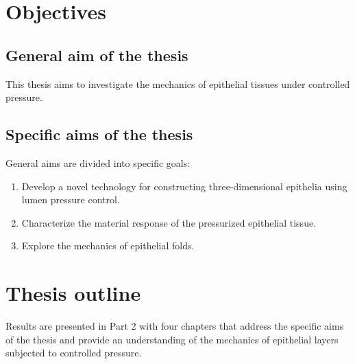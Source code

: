 \hypertarget{objectives}{%
\section{Objectives}\label{objectives}}

\subsection*{General aim of the thesis} 

This thesis aims to investigate the mechanics of epithelial tissues under controlled pressure.  

\subsection*{Specific aims of the thesis} 
General aims are divided into specific goals:

\begin{enumerate}
\def\labelenumi{\arabic{enumi}.}
\item  Develop a novel technology for constructing three-dimensional epithelia using lumen pressure control.  
\item  Characterize the material response of the pressurized epithelial tissue.  
\item  Explore the mechanics of epithelial folds.
\end{enumerate}

\hypertarget{thesis-outline}{%
\section{Thesis outline}\label{thesis-outline}}

Results are presented in Part 2 with four chapters that address the specific aims of the thesis and provide an understanding of the mechanics of epithelial layers subjected to controlled pressure.  

